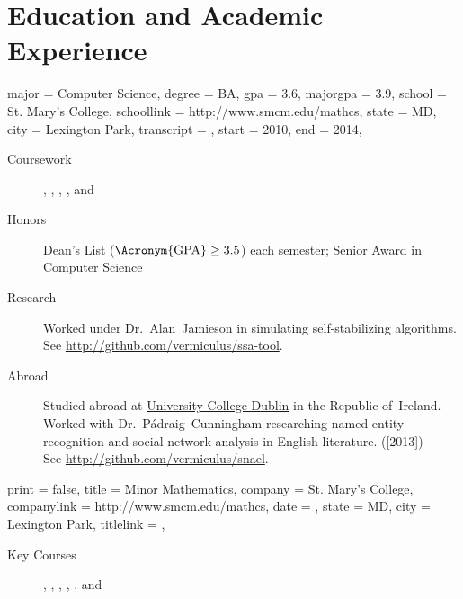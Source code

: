 \documentclass{simplecv}
\begin{document}
\section{Education and Academic Experience}
\begin{education}
  {
    major = Computer Science,
    degree = BA,
    gpa = 3.6,
    majorgpa = 3.9,
    school = St. Mary's College,
    schoollink = http://www.smcm.edu/mathcs,
    state = MD,
    city = Lexington Park,
    transcript = \transcript,
    start = 2010,
    end = 2014,
  }

\begin{description}
\item[Coursework]
  ,
  ,
  ,
  ,
  and
\item[Honors] Dean's List ($\text{\Acronym{GPA}} \geq 3.5$) each semester;
  Senior Award in Computer Science
\item[Research] Worked under Dr.~Alan~Jamieson in simulating
  self-stabilizing algorithms.
  \\
  See \url{http://github.com/vermiculus/ssa-tool}.
\item[Abroad] Studied abroad at \href{http://www.ucd.ie}{University College Dublin} in the Republic of~Ireland.
  Worked with Dr.~P\'adraig~Cunningham researching named-entity recognition and social network
  analysis in English literature. ([2013])
  \\
  See \url{http://github.com/vermiculus/snael}.
\end{description}
\end{education}

\begin{position}
  {
    print   = false,
    title   = Minor \Dash Mathematics,
    company = St. Mary's College,
    companylink = http://www.smcm.edu/mathcs,
    date    = ,
    state   = MD,
    city    = Lexington Park,
    titlelink = \transcript,
  }

  \begin{description}
  \item[Key Courses]
    ,
    ,
    ,
    ,
    ,
    and
  \end{description}
\end{position}
\end{document}
